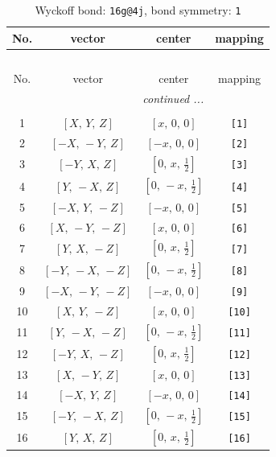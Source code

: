 \documentclass[fleqn,8pt]{jsarticle}
\begin{document}
\begin{longtable}{cccc}
\caption{Wyckoff bond: {\tt 16g@4j}, bond symmetry: {\tt 1}}
 \\
 \hline \hline
No. & vector & center & mapping \\ \hline \endfirsthead

\multicolumn{3}{l}{\tablename\ \thetable{}} \\
 \hline \hline
No. & vector & center & mapping \\ \hline \endhead

 \hline \hline
\multicolumn{3}{r}{\footnotesize\it continued ...} \\ \endfoot

 \hline \hline
\multicolumn{3}{r}{} \\ \endlastfoot

1 & $\left[ X,\, Y,\, Z \right]$ & $\left[ x,\, 0,\, 0 \right]$ & {\tt [1]} \\ \hline
2 & $\left[ - X,\, - Y,\, Z \right]$ & $\left[ - x,\, 0,\, 0 \right]$ & {\tt [2]} \\ \hline
3 & $\left[ - Y,\, X,\, Z \right]$ & $\left[ 0,\, x,\, \frac{1}{2} \right]$ & {\tt [3]} \\ \hline
4 & $\left[ Y,\, - X,\, Z \right]$ & $\left[ 0,\, - x,\, \frac{1}{2} \right]$ & {\tt [4]} \\ \hline
5 & $\left[ - X,\, Y,\, - Z \right]$ & $\left[ - x,\, 0,\, 0 \right]$ & {\tt [5]} \\ \hline
6 & $\left[ X,\, - Y,\, - Z \right]$ & $\left[ x,\, 0,\, 0 \right]$ & {\tt [6]} \\ \hline
7 & $\left[ Y,\, X,\, - Z \right]$ & $\left[ 0,\, x,\, \frac{1}{2} \right]$ & {\tt [7]} \\ \hline
8 & $\left[ - Y,\, - X,\, - Z \right]$ & $\left[ 0,\, - x,\, \frac{1}{2} \right]$ & {\tt [8]} \\ \hline
9 & $\left[ - X,\, - Y,\, - Z \right]$ & $\left[ - x,\, 0,\, 0 \right]$ & {\tt [9]} \\ \hline
10 & $\left[ X,\, Y,\, - Z \right]$ & $\left[ x,\, 0,\, 0 \right]$ & {\tt [10]} \\ \hline
11 & $\left[ Y,\, - X,\, - Z \right]$ & $\left[ 0,\, - x,\, \frac{1}{2} \right]$ & {\tt [11]} \\ \hline
12 & $\left[ - Y,\, X,\, - Z \right]$ & $\left[ 0,\, x,\, \frac{1}{2} \right]$ & {\tt [12]} \\ \hline
13 & $\left[ X,\, - Y,\, Z \right]$ & $\left[ x,\, 0,\, 0 \right]$ & {\tt [13]} \\ \hline
14 & $\left[ - X,\, Y,\, Z \right]$ & $\left[ - x,\, 0,\, 0 \right]$ & {\tt [14]} \\ \hline
15 & $\left[ - Y,\, - X,\, Z \right]$ & $\left[ 0,\, - x,\, \frac{1}{2} \right]$ & {\tt [15]} \\ \hline
16 & $\left[ Y,\, X,\, Z \right]$ & $\left[ 0,\, x,\, \frac{1}{2} \right]$ & {\tt [16]} \\
\end{longtable}
\end{document}
